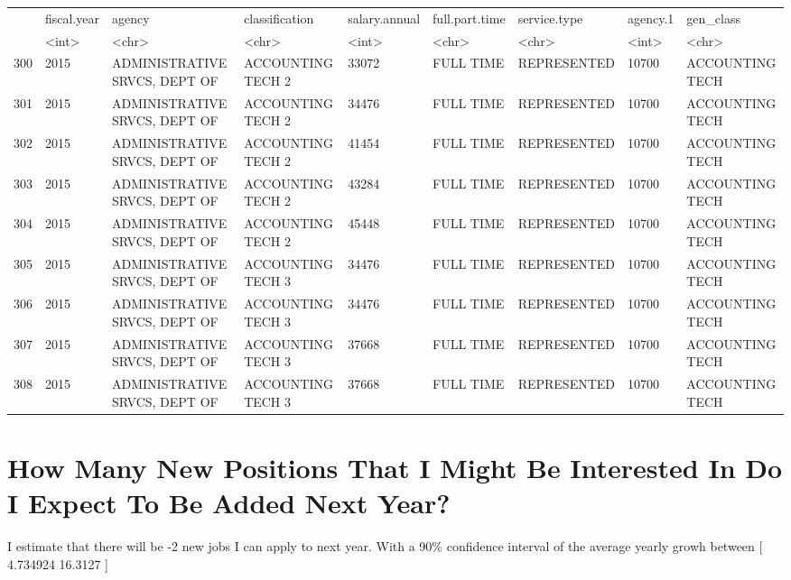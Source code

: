 \documentclass[letterpaper]{article}
\theoremstyle{definition}
\begin{document}
\begin{tabular}{r|llllllll}
  & fiscal.year & agency & classification & salary.annual & full.part.time & service.type & agency.1 & gen\_class\\
  & <int> & <chr> & <chr> & <int> & <chr> & <chr> & <int> & <chr>\\
\hline
	300 & 2015 & ADMINISTRATIVE SRVCS, DEPT OF & ACCOUNTING TECH 2 & 33072 & FULL TIME & REPRESENTED & 10700 & ACCOUNTING TECH\\
	301 & 2015 & ADMINISTRATIVE SRVCS, DEPT OF & ACCOUNTING TECH 2 & 34476 & FULL TIME & REPRESENTED & 10700 & ACCOUNTING TECH\\
	302 & 2015 & ADMINISTRATIVE SRVCS, DEPT OF & ACCOUNTING TECH 2 & 41454 & FULL TIME & REPRESENTED & 10700 & ACCOUNTING TECH\\
	303 & 2015 & ADMINISTRATIVE SRVCS, DEPT OF & ACCOUNTING TECH 2 & 43284 & FULL TIME & REPRESENTED & 10700 & ACCOUNTING TECH\\
	304 & 2015 & ADMINISTRATIVE SRVCS, DEPT OF & ACCOUNTING TECH 2 & 45448 & FULL TIME & REPRESENTED & 10700 & ACCOUNTING TECH\\
	305 & 2015 & ADMINISTRATIVE SRVCS, DEPT OF & ACCOUNTING TECH 3 & 34476 & FULL TIME & REPRESENTED & 10700 & ACCOUNTING TECH\\
	306 & 2015 & ADMINISTRATIVE SRVCS, DEPT OF & ACCOUNTING TECH 3 & 34476 & FULL TIME & REPRESENTED & 10700 & ACCOUNTING TECH\\
	307 & 2015 & ADMINISTRATIVE SRVCS, DEPT OF & ACCOUNTING TECH 3 & 37668 & FULL TIME & REPRESENTED & 10700 & ACCOUNTING TECH\\
	308 & 2015 & ADMINISTRATIVE SRVCS, DEPT OF & ACCOUNTING TECH 3 & 37668 & FULL TIME & REPRESENTED & 10700 & ACCOUNTING TECH\\
\end{tabular}


    
    \hypertarget{how-many-new-positions-that-i-might-be-interested-in-do-i-expect-to-be-added-next-year}{%
\section{How Many New Positions That I Might Be Interested In Do I
Expect To Be Added Next
Year?}\label{how-many-new-positions-that-i-might-be-interested-in-do-i-expect-to-be-added-next-year}}

    

I estimate that there will be -2 new jobs I can apply to next year.
With a 90\% confidence interval of the average yearly growh between [ 4.734924
16.3127 ]
\end{document}
